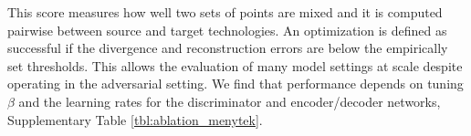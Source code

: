 This score measures how well two sets of points are mixed and it is computed pairwise between source and target technologies.
An optimization is defined as successful if the divergence and reconstruction errors are below the empirically set thresholds.
This allows the evaluation of many model settings at scale despite operating in the adversarial setting.
We find that performance depends on tuning $\beta$ and the learning rates for the discriminator and encoder/decoder networks, Supplementary Table \ref{tbl:ablation_menytek}.


